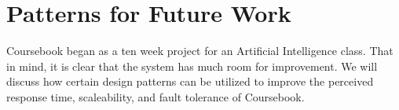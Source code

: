 \chapter{Patterns for Future Work}

Coursebook began as a ten week project for an Artificial Intelligence class.
That in mind, it is clear that the system has much room for improvement. We will
discuss how certain design patterns can be utilized to improve the perceived
response time, scaleability, and fault tolerance of Coursebook.


